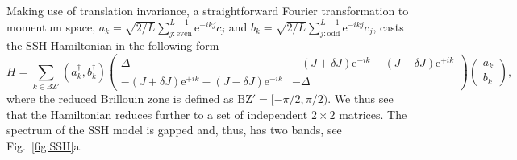 \documentclass{SciPost}
\newcommand\0{\scalebox{-1}[1]{0}}
\begin{document}
Making use of translation invariance, a straightforward Fourier transformation to momentum space, $a_k = \sqrt{2/L}\sum_{j:\mathrm{even}}^{L-1} \mathrm e^{-i k j}c_{j}$ and $b_k = \sqrt{2/L}\sum_{j:\mathrm{odd}}^{L-1}\mathrm e^{-i k j} c_{j}$, casts the SSH Hamiltonian in the following form
\begin{equation}
H \!=\! \sum_{k\in\mathrm{BZ'}} (a^\dagger_k,b^\dagger_k)
\left(\begin{array}{cc}
\Delta & -(J+\delta J)\mathrm e^{-i k} - (J-\delta J)\mathrm e^{+i k} \\
-(J+\delta J)\mathrm e^{+i k} - (J-\delta J)\mathrm e^{-i k} & -\Delta
\end{array}
\right)
\left(\! \begin{array}{c}
a_k\\
b_k
\end{array}
\!\right),
\end{equation}
where the reduced Brillouin zone is defined as $\mathrm{BZ'}=[-\pi/2,\pi/2)$. We thus see that the Hamiltonian reduces further to a set of independent $2\times 2$ matrices. The spectrum of the SSH model is gapped and, thus, has two bands, see Fig.~\ref{fig:SSH}a.
\end{document}
